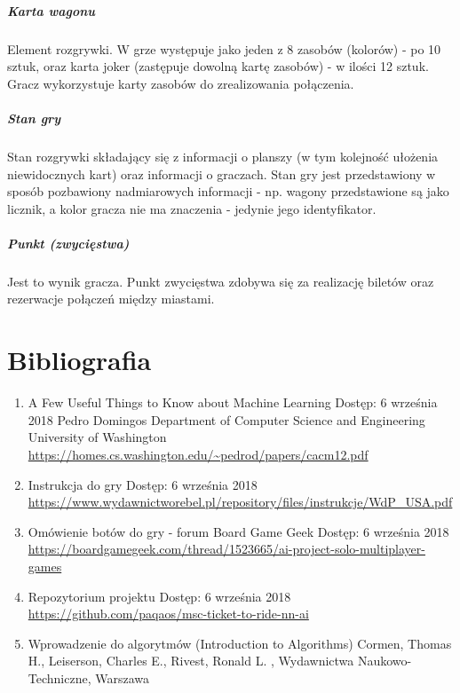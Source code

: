 \documentclass[12pt, oneside]{report}
\begin{document}
	\paragraph{Karta wagonu} Element rozgrywki. W grze występuje jako jeden z 8 zasobów (kolorów) - po 10 sztuk, oraz karta joker (zastępuje dowolną kartę zasobów) - w ilości 12 sztuk. Gracz wykorzystuje karty zasobów do zrealizowania połączenia.
	\paragraph{Stan gry} Stan rozgrywki składający się z informacji o planszy (w tym kolejność ułożenia niewidocznych kart) oraz informacji o graczach. Stan gry jest przedstawiony w sposób pozbawiony nadmiarowych informacji - np. wagony przedstawione są jako licznik, a kolor gracza nie ma znaczenia - jedynie jego identyfikator.
	\paragraph{Punkt (zwycięstwa)} Jest to wynik gracza. Punkt zwycięstwa zdobywa się za realizację biletów oraz rezerwacje połączeń między miastami.
	\chapter{Bibliografia}
	\begin{enumerate}
		\item{A Few Useful Things to Know about Machine Learning
		}
		\subitem Dostęp: 6 września 2018
		\subitem Pedro Domingos
		\subitem Department of Computer Science and Engineering
		\subitem University of Washington
		\subitem \url{https://homes.cs.washington.edu/~pedrod/papers/cacm12.pdf}
		
		\item{Instrukcja do gry}
		\subitem Dostęp: 6 września 2018
		\subitem \url{https://www.wydawnictworebel.pl/repository/files/instrukcje/WdP_USA.pdf}
		
		\item{Omówienie botów do gry - forum Board Game Geek}
		\subitem Dostęp: 6 września 2018
		\subitem \url{https://boardgamegeek.com/thread/1523665/ai-project-solo-multiplayer-games}
		\item{Repozytorium projektu}
		\subitem Dostęp: 6 września 2018
		\subitem \url{https://github.com/paqaos/msc-ticket-to-ride-nn-ai}
		\item{Wprowadzenie do algorytmów (Introduction to Algorithms)}
		\subitem Cormen, Thomas H., Leiserson, Charles E., Rivest, Ronald L.
		, Wydawnictwa Naukowo-Techniczne, Warszawa
	\end{enumerate}
	\listoffigures
	\listoftables
\end{document}
